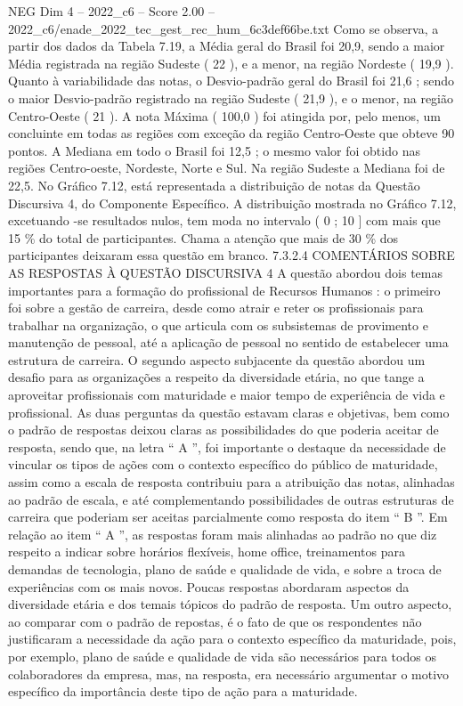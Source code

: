\begin{textsample}{NEG Dim 4 – 2022\_c6 – Score 2.00 – 2022\_c6/enade\_2022\_tec\_gest\_rec\_hum\_6c3def66be.txt}
Como se observa, a partir dos dados da Tabela 7.19, a Média geral do Brasil foi 20,9, sendo a maior Média registrada na região Sudeste ( 22 ), e a menor, na região Nordeste ( 19,9 ).
Quanto à variabilidade das notas, o Desvio-padrão geral do Brasil foi 21,6 ; sendo o maior Desvio-padrão registrado na região Sudeste ( 21,9 ), e o menor, na região Centro-Oeste ( 21 ).
A nota Máxima ( 100,0 ) foi atingida por, pelo menos, um concluinte em todas as regiões com exceção da região Centro-Oeste que obteve 90 pontos.
A Mediana em todo o Brasil foi 12,5 ; o mesmo valor foi obtido nas regiões Centro-oeste, Nordeste, Norte e Sul.
Na região Sudeste a Mediana foi de 22,5.
No Gráfico 7.12, está representada a distribuição de notas da Questão Discursiva 4, do Componente Específico.
A distribuição mostrada no Gráfico 7.12, excetuando -se resultados nulos, tem moda no intervalo ( 0 ; 10 ] com mais que 15 \% do total de participantes.
Chama a atenção que mais de 30 \% dos participantes deixaram essa questão em branco. 7.3.2.4 COMENTÁRIOS SOBRE AS RESPOSTAS À QUESTÃO DISCURSIVA 4 A questão abordou dois temas importantes para a formação do profissional de Recursos Humanos : o primeiro foi sobre a gestão de carreira, desde como atrair e reter os profissionais para trabalhar na organização, o que articula com os subsistemas de provimento e manutenção de pessoal, até a aplicação de pessoal no sentido de estabelecer uma estrutura de carreira.
O segundo aspecto subjacente da questão abordou um desafio para as organizações a respeito da diversidade etária, no que tange a aproveitar profissionais com maturidade e maior tempo de experiência de vida e profissional.
As duas perguntas da questão estavam claras e objetivas, bem como o padrão de respostas deixou claras as possibilidades do que poderia aceitar de resposta, sendo que, na letra “ A ”, foi importante o destaque da necessidade de vincular os tipos de ações com o contexto específico do público de maturidade, assim como a escala de resposta contribuiu para a atribuição das notas, alinhadas ao padrão de escala, e até complementando possibilidades de outras estruturas de carreira que poderiam ser aceitas parcialmente como resposta do item “ B ”.
Em relação ao item “ A ”, as respostas foram mais alinhadas ao padrão no que diz respeito a indicar sobre horários flexíveis, home office, treinamentos para demandas de tecnologia, plano de saúde e qualidade de vida, e sobre a troca de experiências com os mais novos.
Poucas respostas abordaram aspectos da diversidade etária e dos temais tópicos do padrão de resposta.
Um outro aspecto, ao comparar com o padrão de repostas, é o fato de que os respondentes não justificaram a necessidade da ação para o contexto específico da maturidade, pois, por exemplo, plano de saúde e qualidade de vida são necessários para todos os colaboradores da empresa, mas, na resposta, era necessário argumentar o motivo específico da importância deste tipo de ação para a maturidade.

\end{textsample}
